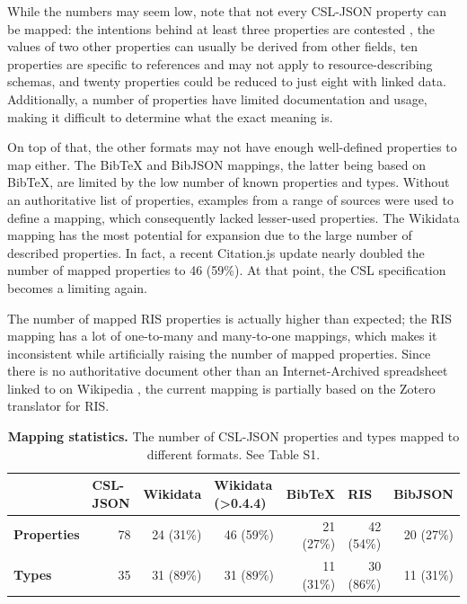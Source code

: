 \documentclass[fleqn,10pt,lineno]{wlpeerj} %
\begin{document}
While the numbers may seem low, note that not every CSL-JSON property can be mapped: the intentions behind at least three properties are contested \citep{wiernik_inconsistencies_2018}, the values of two other properties can usually be derived from other fields, ten properties are specific to references and may not apply to resource-describing schemas, and twenty properties could be reduced to just eight with linked data. Additionally, a number of properties have limited documentation and usage, making it difficult to determine what the exact meaning is.

On top of that, the other formats may not have enough well-defined properties to map either. The BibTeX and BibJSON mappings, the latter being based on BibTeX, are limited by the low number of known properties and types. Without an authoritative list of properties, examples from a range of sources were used to define a mapping, which consequently lacked lesser-used properties. The Wikidata mapping has the most potential for expansion due to the large number of described properties. In fact, a recent Citation.js update nearly doubled the number of mapped properties to 46 (59\%). At that point, the CSL specification becomes a limiting again.

The number of mapped RIS properties is actually higher than expected; the RIS mapping has a lot of one-to-many and many-to-one mappings, which makes it inconsistent while artificially raising the number of mapped properties. Since there is no authoritative document other than an Internet-Archived spreadsheet linked to on Wikipedia \citep{noauthor_ris_2012}, the current mapping is partially based on the Zotero translator for RIS.

\begin{table}[bt]
\caption{\textbf{Mapping statistics.} The number of CSL-JSON properties and types mapped to different formats. See Table S1. }
\label{table:completeness}
\begin{tabular}{l|r|r|r|r|r|r|}
\cline{2-7}
                                          & \multicolumn{1}{l|}{\textbf{CSL-JSON}} & \multicolumn{1}{l|}{\textbf{Wikidata}} & \multicolumn{1}{l|}{\textbf{Wikidata (\textgreater{}0.4.4)}} & \multicolumn{1}{l|}{\textbf{BibTeX}} & \multicolumn{1}{l|}{\textbf{RIS}} & \multicolumn{1}{l|}{\textbf{BibJSON}} \\ \hline
\multicolumn{1}{|l|}{\textbf{Properties}} & 78                                     & 24 (31\%)                              & 46 (59\%)                                                    & 21 (27\%)                            & 42 (54\%)                         & 20 (27\%)                             \\ \hline
\multicolumn{1}{|l|}{\textbf{Types}}      & 35                                     & 31 (89\%)                              & 31 (89\%)                                                    & 11 (31\%)                            & 30 (86\%)                         & 11 (31\%)                             \\ \hline
\end{tabular}
\end{table}
\end{document}

